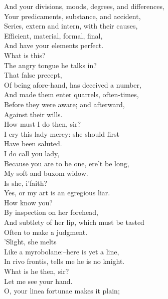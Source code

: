 \documentclass{memoir}
\begin{document}
\begin{drama*}
 And your divisions, moods, degrees, and differences,\\
 Your predicaments, substance, and accident,\\
 Series, extern and intern, with their causes,\\
 Efficient, material, formal, final,\\
 And have your elements perfect.\\
\kastrilspeaks {} What is this?\\
 The angry tongue he talks in?\\
\subtlespeaks {} That false precept,\\
 Of being afore-hand, has deceived a number,\\
 And made them enter quarrels, often-times,\\
 Before they were aware; and afterward,\\
 Against their wills.\\
\kastrilspeaks {} How must I do then, sir?\\
\subtlespeaks  I cry this lady mercy: she should first\\
 Have been saluted.\\
 I do call you lady,\\
 Because you are to be one, ere't be long,\\
 My soft and buxom widow.\\
\kastrilspeaks {} Is she, i'faith?\\
\subtlespeaks  Yes, or my art is an egregious liar.\\
\kastrilspeaks  How know you?\\
\subtlespeaks {} By inspection on her forehead,\\
 And subtlety of her lip, which must be tasted\\
 Often to make a judgment.\\
 'Slight, she melts\\
 Like a myrobolane:--here is yet a line,\\
 In rivo frontis, tells me he is no knight.\\
\pliantspeaks  What is he then, sir?\\
\subtlespeaks {} Let me see your hand.\\
 O, your linea fortunae makes it plain;\\

\end{drama*}
\end{document}
